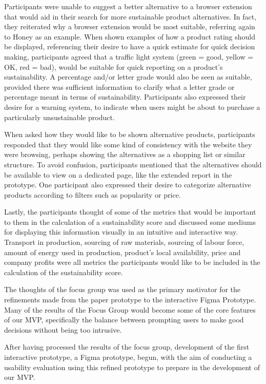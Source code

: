 \documentclass[a4,10pt,twocolumn]{article}
\begin{document}
\begin{itemize}
    Participants were unable to suggest a better alternative to a browser extension that would aid in their search for more sustainable product alternatives. In fact, they reiterated why a browser extension would be most suitable, referring again to Honey as an example. When shown examples of how a product rating should be displayed, referencing their desire to have a quick estimate for quick decision making, participants agreed that a traffic light system (green = good, yellow = OK, red = bad), would be suitable for quick reporting on a product's sustainability. A percentage and/or letter grade would also be seen as suitable, provided there was sufficient information to clarify what a letter grade or percentage meant in terms of sustainability. Participants also expressed their desire for a warning system, to indicate when users might be about to purchase a particularly unsustainable product.

    When asked how they would like to be shown alternative products, participants responded that they would like some kind of consistency with the website they were browsing, perhaps showing the alternatives as a shopping list or similar structure. To avoid confusion, participants mentioned that the alternatives should be available to view on a dedicated page, like the extended report in the prototype. One participant also expressed their desire to categorize alternative products according to filters such as popularity or price. 

    Lastly, the participants thought of some of the metrics that would be important to them in the calculation of a sustainability score and discussed some mediums for displaying this information visually in an intuitive and interactive way. Transport in production, sourcing of raw materials, sourcing of labour force, amount of energy used in production, product's local availability, price and company profits were all metrics the participants would like to be included in the calculation of the sustainability score.
\end{itemize}

The thoughts of the focus group was used as the primary motivator for the refinements made from the paper prototype to the interactive Figma Prototype. Many of the results of the Focus Group would become some of the core features of our MVP, specifically the balance between prompting users to make good decisions without being too intrusive.

After having processed the results of the focus group, development of the first interactive prototype, a Figma prototype, begun, with the aim of conducting a usability evaluation using this refined prototype to prepare in the development of our MVP.
\end{document}
